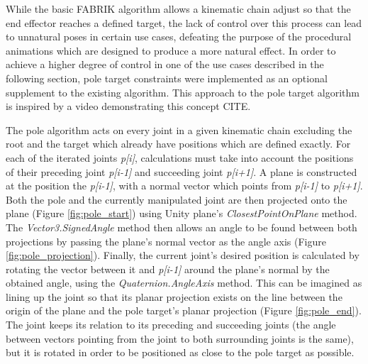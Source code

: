 


While the basic FABRIK algorithm allows a kinematic chain adjust so that the end
effector reaches a defined target, the lack of control over this process can
lead to unnatural poses in certain use cases, defeating the purpose of the
procedural animations which are designed to produce a more natural effect. In
order to achieve a higher degree of control in one of the use cases described in
the following section, pole target constraints were implemented as an optional
supplement to the existing algorithm. This approach to the pole target algorithm
is inspired by a video demonstrating this concept CITE.

The pole algorithm acts on every joint in a given kinematic chain excluding the
root and the target which already have positions which are defined exactly. For
each of the iterated joints \textit{p[i]}, calculations must take into account
the positions of their preceding joint \textit{p[i-1]} and succeeding joint
\textit{p[i+1]}. A plane is constructed at the position the \textit{p[i-1]},
with a normal vector which points from \textit{p[i-1]} to \textit{p[i+1]}. Both
the pole and the currently manipulated joint are then projected onto the plane
(Figure \ref{fig:pole_start}) using Unity plane's \textit{ClosestPointOnPlane}
method. The \textit{Vector3.SignedAngle} method then allows an angle to be found
between both projections by passing the plane's normal vector as the angle axis
(Figure \ref{fig:pole_projection}). Finally, the current joint's desired
position is calculated by rotating the vector between it and \textit{p[i-1]}
around the plane's normal by the obtained angle, using the
\textit{Quaternion.AngleAxis} method. This can be imagined as lining up the
joint so that its planar projection exists on the line between the origin of the
plane and the pole target's planar projection (Figure \ref{fig:pole_end}). The
joint keeps its relation to its preceding and succeeding joints (the angle
between vectors pointing from the joint to both surrounding joints is the same),
but it is rotated in order to be positioned as close to the pole target as
possible.

